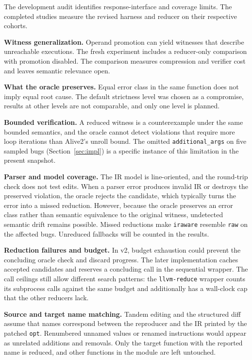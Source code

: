 \documentclass[conference]{IEEEtran}
\newcommand{\cn}[1]{\texttt{#1}}   %
\begin{document}
The development audit identifies response-interface and coverage limits. The completed studies measure the revised harness and reducer on their respective cohorts.

\textbf{Witness generalization.} Operand promotion can yield witnesses that describe unreachable executions. The fresh experiment includes a reducer-only comparison with promotion disabled. The comparison measures compression and verifier cost and leaves semantic relevance open.

\textbf{What the oracle preserves.} Equal error class in the same function does not imply equal root cause. The default strictness level was chosen as a compromise, results at other levels are not comparable, and only one level is planned.

\textbf{Bounded verification.} A reduced witness is a counterexample under the same bounded semantics, and the oracle cannot detect violations that require more loop iterations than Alive2's unroll bound. The omitted \texttt{additional\_args} on five sampled bugs (Section~\ref{sec:impl}) is a specific instance of this limitation in the present snapshot.

\textbf{Parser and model coverage.} The IR model is line-oriented, and the round-trip check does not test edits. When a parser error produces invalid IR or destroys the preserved violation, the oracle rejects the candidate, which typically turns the error into a missed reduction. However, because the oracle preserves an error class rather than semantic equivalence to the original witness, undetected semantic drift remains possible. Missed reductions make \cn{iraware} resemble \cn{raw} on the affected bugs. Unreduced fallbacks will be counted in the results.

\textbf{Reduction failures and budget.} In v2, budget exhaustion could prevent the concluding oracle check and discard progress. The later implementation caches accepted candidates and reserves a concluding call in the sequential wrapper. The call ceilings still allow different search patterns: the \texttt{llvm-reduce} wrapper counts its subprocess calls against the same budget and additionally has a wall-clock cap that the other reducers lack.

\textbf{Source and target name matching.} Tandem editing and the structured diff assume that names correspond between the reproducer and the IR printed by the patched \texttt{opt}. Renumbered unnamed values or renamed instructions would appear as unrelated additions and removals. Only the target function with the reported name is reduced, and other functions in the module are left untouched.
\end{document}
